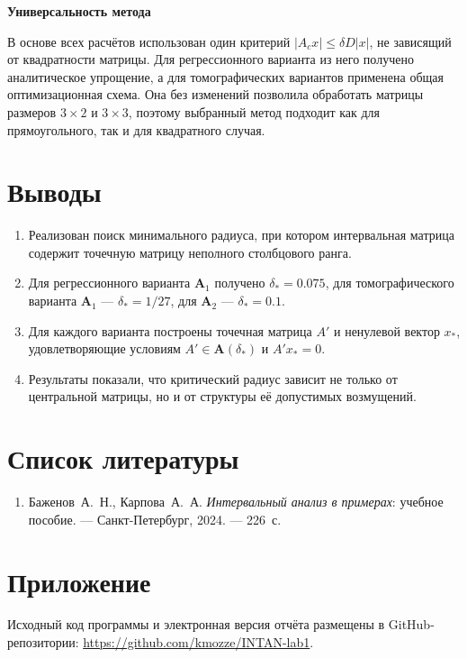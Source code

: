 \documentclass[12pt,a4paper]{article}
\numberwithin{equation}{section}
\newcommand{\theorypart}[1]{%
    \par\medskip
    \noindent\textbf{#1}\par\nopagebreak\smallskip
}
\begin{document}
\theorypart{Универсальность метода}
В основе всех расчётов использован один критерий
$|A_cx|\leq\delta D|x|$, не зависящий от квадратности матрицы.
Для регрессионного варианта из него получено аналитическое упрощение,
а для томографических вариантов применена общая оптимизационная схема.
Она без изменений позволила обработать матрицы размеров $3\times2$ и
$3\times3$, поэтому выбранный метод подходит как для прямоугольного,
так и для квадратного случая.

\section{Выводы}

\begin{enumerate}
    \item Реализован поиск минимального радиуса, при котором интервальная
    матрица содержит точечную матрицу неполного столбцового ранга.

    \item Для регрессионного варианта $\boldsymbol{A}_1$ получено
    $\delta_*=0.075$, для томографического варианта
    $\boldsymbol{A}_1$ --- $\delta_*=1/27$, для
    $\boldsymbol{A}_2$ --- $\delta_*=0.1$.

    \item Для каждого варианта построены точечная матрица $A'$ и
    ненулевой вектор $x_*$, удовлетворяющие условиям
    $A'\in\boldsymbol{A}(\delta_*)$ и $A'x_*=0$.

    \item Результаты показали, что критический радиус зависит не только
    от центральной матрицы, но и от структуры её допустимых возмущений.
\end{enumerate}

\section{Список литературы}
\begin{enumerate}
    \item Баженов~А.~Н., Карпова~А.~А.
    \emph{Интервальный анализ в примерах}: учебное пособие. ---
    Санкт-Петербург, 2024. --- 226~с.
\end{enumerate}

\section{Приложение}

Исходный код программы и электронная версия отчёта размещены в
GitHub-репозитории:
\url{https://github.com/kmozze/INTAN-lab1}.
\end{document}
